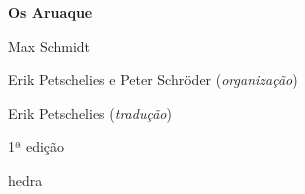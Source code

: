 




\begingroup\thispagestyle{empty}\vspace*{.05\textheight} 

              \formular
              \Huge
              \noindent
              \textbf{Os Aruaque}

              \bigskip  
              
              \LARGE
              \noindent
              Max Schmidt
              \vspace{6.8em}
              
              \newfontfamily{}
              {\selectfont\minion\small\noindent Erik Petschelies e Peter Schröder (\textit{organização})\\\vspace*{-.7cm}

              \noindent Erik Petschelies (\textit{tradução})}

              \bigskip

              \noindent
              {\selectfont\minion\small\noindent 1ª edição}

              \vfill

              \newfontfamily{}
              {\noindent\fontsize{30}{40}\selectfont \timesnewroman hedra}


\endgroup
\pagebreak

